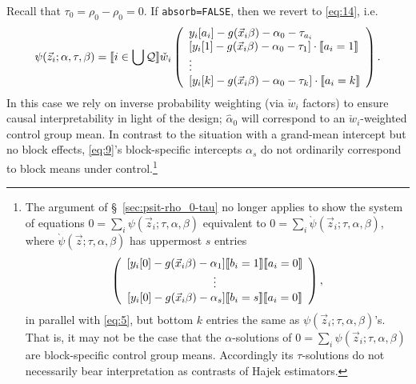 \documentclass{article}
\DeclarePairedDelimiter{\indicator}{\llbracket}{\rrbracket}
\newcommand{\owt}[1][{[a_i]}]{\ensuremath{\check{w}_{i#1}}}
\begin{document}
Recall that $\tau_{0} = \rho_{0}-\rho_{0}=0$.  If \texttt{absorb=FALSE}, then we revert to \eqref{eq:14}, i.e.
\begin{equation*}
         \psi(\vec{z}_{i};
  \alpha, \tau, \beta) = \indicator{i \in \bigcup \mathcal{Q}}\owt[]
         \left( \begin{array}{l}
           y_{i}[a_{i}] - g(\vec{x}_{i}\beta)-
                  \alpha_0 - \tau_{a_{i}}\\
           {}[y_{i}[1] - g(\vec{x}_{i}\beta)-
                  \alpha_0-\tau_{1}]\cdot \indicator{a_{i}=1}\\
                  \vdots \\
           {}[y_{i}[k] - g(\vec{x}_{i}\beta)-
                 \alpha_0 - \tau_{k}]\cdot \indicator{a_{i}=k}\\%
                \end{array}\right).
\end{equation*}
In this case we rely on inverse probability weighting (via $\owt[]$ factors) to ensure causal interpretability in light of the design;  $\hat{\alpha}_0$ will correspond to an $\owt[]$-weighted control group mean. In contrast to the situation with a grand-mean intercept but no block effects, \eqref{eq:9}'s block-specific intercepts $\alpha_s$ do not ordinarily correspond to block means under control.\footnote{%
The argument of \S~\ref{sec:psit-rho_0-tau} no longer applies
to show the system of equations
$0=\sum_{i}\psi(\vec{z}_{i}; \tau, \alpha, \beta)$
equivalent to $0=\sum_{i}\grave{\psi}(\vec{z}_{i}; \tau,
\alpha, \beta)$, where $\grave{\psi}(\vec{z}; \tau,
\alpha, \beta)$ has uppermost $s$ entries
\begin{equation*}
    \left(
    \begin{array}{c}
           [y_{i}[0] - g(\vec{x}_{i}\beta)-
                  \alpha_{1} ]\indicator{b_{i}=1} \indicator{a_{i}=0}\\
      \vdots\\ 
          {} [y_{i}[0] - g(\vec{x}_{i}\beta)-
                  \alpha_{s}]\indicator{b_{i}=s} \indicator{a_{i}=0}\\      
    \end{array}
    \right),
  \end{equation*}
in parallel with \eqref{eq:5}, but bottom $k$ entries the same as ${\psi}(\vec{z}_{i}; \tau,
\alpha, \beta)$'s. That is, it may not be the case that the $\alpha$-solutions of
$0=\sum_{i}\psi(\vec{z}_{i}; \tau, \alpha, \beta)$ are
block-specific control group means.  Accordingly its $\tau$-solutions
do not necessarily bear interpretation as contrasts of Hajek estimators.
}
\end{document}
